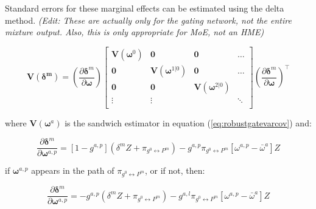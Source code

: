 \documentclass[12pt]{article}
\newcommand{\mean}[1]{\bar{#1}}
\newcommand{\gateprod}[2]{\pi_{#1 \longleftrightarrow #2}}
\begin{document}
\bigskip 

Standard errors for these marginal effects can be estimated using the
delta method. \textit{(Edit: These are actually only for the gating network, not
the entire mixture output. Also, this is only appropriate for MoE, not an
HME)}

\newcommand{\deltavar}{%
  \begin{bmatrix}
    \boldsymbol{V}(\boldsymbol{\omega}^{0}) & \boldsymbol{0}                            & \boldsymbol{0}                            & \dots  \\ 
    \boldsymbol{0}                          & \boldsymbol{V}(\boldsymbol{\omega}^{1|0}) & \boldsymbol{0}                            & \dots  \\
    \boldsymbol{0}                          & \boldsymbol{0}                            & \boldsymbol{V}(\boldsymbol{\omega}^{2|0}) &        \\
    \vdots                                  & \vdots                                    &                                           & \ddots \\
  \end{bmatrix}
}

\begin{equation}
    \boldsymbol{V}(\boldsymbol{\delta^{m}}) = \left(\frac{\partial \boldsymbol{\delta}^{m}}{\partial \boldsymbol{\omega}} \right) \deltavar  \left(\frac{\partial \boldsymbol{\delta}^{m}}{\partial \boldsymbol{\omega}} \right)^{\top}
\end{equation}

where $\boldsymbol{V}(\boldsymbol{\omega}^{a})$ is the sandwich estimator
in equation (\ref{eq:robustgatevarcov}) and:

\begin{equation}
  \frac{\partial \boldsymbol{\delta}^{m}}{\partial \boldsymbol{\omega}^{a,p}} = [1 - g^{a, p}] (\delta^{m} Z + \gateprod{g^{0}}{P^{m}}) - g^{a,p} \gateprod{g^{0}}{P^{m}} [\omega^{a,p} - \mean{\omega}^{a}] Z
\end{equation}

if $\boldsymbol{\omega}^{a,p}$ appears in the path of $\gateprod{g^{0}}{P^{m}}$, or if not,
then:

\begin{equation}
  \frac{\partial \boldsymbol{\delta}^{m}}{\partial \boldsymbol{\omega}^{a,p}} = -g^{a, p} (\delta^{m} Z + \gateprod{g^{0}}{P^{m}}) - g^{a,l} \gateprod{g^{0}}{P^{m}} [\omega^{a,p} - \mean{\omega}^{a}] Z
\end{equation}
\end{document}
